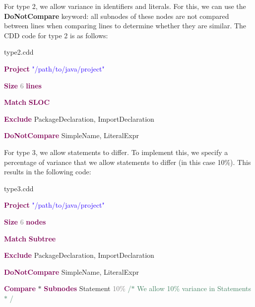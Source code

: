 \documentclass[sigplan,10pt,review,anonymous]{acmart}
\begin{document}
For type 2, we allow variance in identifiers and literals. For this, we can use the \textbf{DoNotCompare} keyword: all subnodes of these nodes are not compared between lines when comparing lines to determine whether they are similar. The CDD code for type 2 is as follows:

\noindent\makebox[\linewidth]{\rule{\linewidth}{0.4pt}}
\noindent type2.cdd\par
\noindent\makebox[\linewidth]{\rule{\linewidth}{0.4pt}}
\noindent\textbf{\textcolor[HTML]{7F0055}{Project}} \textcolor[HTML]{2A00FF}{"/path/to/java/project"}\par
\noindent\textbf{\textcolor[HTML]{7F0055}{Size}} \textcolor[HTML]{7D7D7D}{6} \textbf{\textcolor[HTML]{7F0055}{lines}}\par
\noindent\textbf{\textcolor[HTML]{7F0055}{Match}} \textbf{\textcolor[HTML]{7F0055}{SLOC}}\par
\noindent\textbf{\textcolor[HTML]{7F0055}{Exclude}} PackageDeclaration, ImportDeclaration\par
\noindent\textbf{\textcolor[HTML]{7F0055}{DoNotCompare}} SimpleName, LiteralExpr\par
\noindent\makebox[\linewidth]{\rule{\linewidth}{0.4pt}}

For type 3, we allow statements to differ. To implement this, we specify a percentage of variance that we allow statements to differ (in this case 10\%). This results in the following code:

\noindent\makebox[\linewidth]{\rule{\linewidth}{0.4pt}}
\noindent type3.cdd\par
\noindent\makebox[\linewidth]{\rule{\linewidth}{0.4pt}}
\noindent \textbf{\textcolor[HTML]{7F0055}{Project}} \textcolor[HTML]{2A00FF}{"/path/to/java/project"}\par
\noindent \textbf{\textcolor[HTML]{7F0055}{Size}} \textcolor[HTML]{7D7D7D}{6} \textbf{\textcolor[HTML]{7F0055}{nodes}}\par
\noindent \textbf{\textcolor[HTML]{7F0055}{Match}} \textbf{\textcolor[HTML]{7F0055}{Subtree}}\par
\noindent \textbf{\textcolor[HTML]{7F0055}{Exclude}} PackageDeclaration, ImportDeclaration\par
\noindent \textbf{\textcolor[HTML]{7F0055}{DoNotCompare}} SimpleName, LiteralExpr\par
\noindent\textbf{\textcolor[HTML]{7F0055}{Compare}} $\ast$  \textbf{\textcolor[HTML]{7F0055}{Subnodes}} Statement \textcolor[HTML]{7D7D7D}{10$\%$}  \textcolor[HTML]{3F7F5F}{/$\ast$  We allow 10$\%$  variance in Statements $\ast$ /}\par
\noindent\makebox[\linewidth]{\rule{\linewidth}{0.4pt}}
\end{document}
